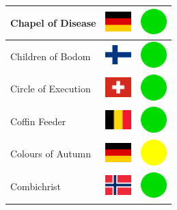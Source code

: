 \documentclass[12pt, a4paper, twoside]{report}
\begin{document}
\begin{center}
\begin{longtable}{|p{5cm}|p{2cm}|p{2cm}|}
			Chapel of Disease & \includegraphics[width=1cm]{4x3/de} & \includegraphics[width=1cm]{likes/y} \\ \hline
			Children of Bodom & \includegraphics[width=1cm]{4x3/fi} & \includegraphics[width=1cm]{likes/y} \\ \hline
			Circle of Execution & \includegraphics[width=1cm]{4x3/ch} & \includegraphics[width=1cm]{likes/y} \\ \hline
			Coffin Feeder & \includegraphics[width=1cm]{4x3/be} & \includegraphics[width=1cm]{likes/y} \\ \hline
			Colours of Autumn & \includegraphics[width=1cm]{4x3/de} & \includegraphics[width=1cm]{likes/m} \\ \hline
			Combichrist & \includegraphics[width=1cm]{4x3/no} & \includegraphics[width=1cm]{likes/y} \\ \hline

\end{longtable}
\end{center}
\end{document}
